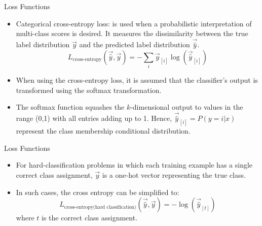 \documentclass[handout]{beamer}
\begin{document}
\begin{frame}{Loss Functions}
\begin{scriptsize}
\begin{itemize}

 \item Categorical cross-entropy loss:  is used when a probabilistic interpretation of multi-class scores is desired. It measures the dissimilarity between the true label distribution $\vec{y}$ and the predicted label distribution $\vec{\hat{y}}$. 
   \begin{displaymath}
  L_{\text{cross-entropy}}(\vec{\hat{y}},\vec{y}) = - \sum_{i} \vec{y}_{[i]} \log(\vec{\hat{y}}_{[i]})   
 \end{displaymath}
 \item When using the cross-entropy loss, it is assumed that the classifier's output is transformed using the softmax transformation.

 \item The softmax function squashes the $k$-dimensional output to values in the range (0,1) with all entries adding up to 1. Hence, $\vec{\hat{y}}_{[i]} = P( y = i |x)$ represent the class membership conditional distribution.
 
\end{itemize}
\end{scriptsize}


\end{frame}


\begin{frame}{Loss Functions}
\begin{scriptsize}
\begin{itemize}



\item For hard-classification problems in which each training example has a single correct class assignment, $\vec{y}$ is a one-hot vector representing the true class. 
\item In such cases, the cross entropy can be simplified to:
   \begin{displaymath}
  L_{\text{cross-entropy(hard classification)}}(\vec{\hat{y}},\vec{y}) = -\log(\vec{\hat{y}}_{[t]})   
 \end{displaymath}
 where $t$ is the correct class assignment.



 
\end{itemize}
\end{scriptsize}


\end{frame}
\end{document}
